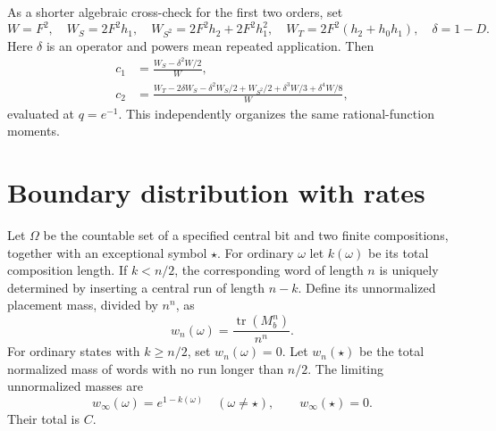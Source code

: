 \documentclass[11pt,letterpaper]{article}
\numberwithin{equation}{section}
\theoremstyle{remark}\newtheorem{remark}[theorem]{Remark}
\DeclareMathOperator{\tr}{tr}\DeclareMathOperator{\TV}{TV}
\begin{document}
As a shorter algebraic cross-check for the first two orders, set
\[
W=F^2,\quad W_S=2F^2h_1,\quad W_{S^2}=2F^2h_2+2F^2h_1^2,
\quad W_T=2F^2(h_2+h_0h_1),\quad\delta=1-D.
\]
Here $\delta$ is an operator and powers mean repeated application. Then
\begin{align}
c_1&=\frac{W_S-\delta^2W/2}{W},\nonumber\\
c_2&=\frac{W_T-2\delta W_S-\delta^2W_S/2+W_{S^2}/2
+\delta^3W/3+\delta^4W/8}{W},\label{mdk:sq:eq:short-coeff}
\end{align}
evaluated at $q=e^{-1}$. This independently organizes the same rational-function moments.

\section{Boundary distribution with rates}\label{mdk:sq:sec:law}
Let $\Omega$ be the countable set of a specified central bit and two finite compositions, together with an exceptional symbol $\star$. For ordinary $\omega$ let $k(\omega)$ be its total composition length. If $k<n/2$, the corresponding word of length $n$ is uniquely determined by inserting a central run of length $n-k$. Define its unnormalized placement mass, divided by $n^n$, as
\[
w_n(\omega)=\frac{\tr(M_b^n)}{n^n}.
\]
For ordinary states with $k\ge n/2$, set $w_n(\omega)=0$. Let $w_n(\star)$ be the total normalized mass of words with no run longer than $n/2$. The limiting unnormalized masses are
\begin{equation}\label{mdk:sq:eq:weights}
w_\infty(\omega)=e^{1-k(\omega)}\quad(\omega\ne\star),\qquad
w_\infty(\star)=0.
\end{equation}
Their total is $C$.
\end{document}
